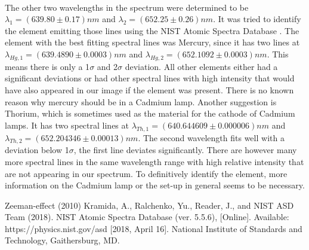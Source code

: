 \documentclass[12pt]{article}
\begin{document}
\\The other two wavelengths in the spectrum were determined to be $\lambda_1=(639.80\pm0.17)nm$ and $\lambda_2=(652.25\pm0.26)nm$. It was tried to identify the element emitting those lines using the NIST Atomic Spectra Database \cite{nist}. The element with the best fitting spectral lines was Mercury, since it has two lines at $\lambda_{Hg,1}=(639.4890\pm0.0003)nm$ and $\lambda_{Hg,2}=(652.1092\pm0.0003)nm$. This means there is only a 1$\sigma$ and 2$\sigma$ deviation. All other elements either had a significant deviations or had other spectral lines with high intensity that would have also appeared in our image if the element was present. There is no known reason why mercury should be in a Cadmium lamp. Another suggestion is Thorium, which is sometimes used as the material for the cathode of Cadmium lamps. It has two spectral lines at $\lambda_{Th,1}=(640.644609\pm0.000006)nm$ and $\lambda_{Th,2}=(652.204346\pm0.00013)nm$. The second wavelength fits well with a deviation below 1$\sigma$, the first line deviates significantly. There are however many more spectral lines in the same wavelength range with high relative intensity that are not appearing in our spectrum. To definitively identify the element, more information on the Cadmium lamp or the set-up in general seems to be necessary. 



\newpage
\begin{thebibliography}{00}   %

 Zeeman-effect (2010)
 Kramida, A., Ralchenko, Yu., Reader, J., and NIST ASD Team (2018). NIST Atomic Spectra Database (ver. 5.5.6), [Online]. Available: https://physics.nist.gov/asd [2018, April 16]. National Institute of Standards and Technology, Gaithersburg, MD. 

\end{thebibliography}
\end{document}
